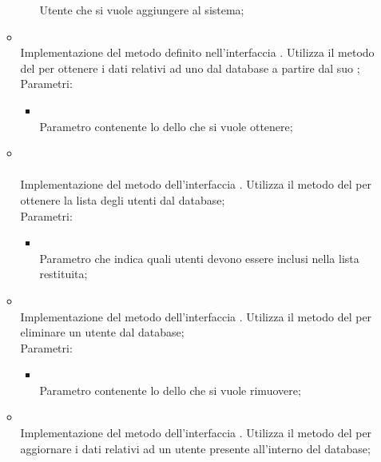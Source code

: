 \begin{itemize}
\begin{itemize}
\begin{itemize}
			Utente che si vuole aggiungere al sistema;
		\end{itemize}
		\item[]  \\		Implementazione del metodo definito nell'interfaccia . Utilizza il metodo  del  per ottenere i dati relativi ad uno  dal database a partire dal suo ;\\
		Parametri:
		\begin{itemize}
			\item {} \\
			Parametro contenente lo  dello  che si vuole ottenere;
		\end{itemize}
		\item[]  \\\\		Implementazione del metodo dell'interfaccia . Utilizza il metodo  del  per ottenere la lista degli utenti dal database;\\
		Parametri:
		\begin{itemize}
			\item {} \\
			Parametro che indica quali utenti devono essere inclusi nella lista restituita;
		\end{itemize}
		\item[]  \\		Implementazione del metodo dell'interfaccia . Utilizza il metodo  del  per eliminare un utente dal database;\\
		Parametri:
		\begin{itemize}
			\item {} \\
			Parametro contenente lo  dello  che si vuole rimuovere;
		\end{itemize}
		\item[]  \\		Implementazione del metodo dell'interfaccia . Utilizza il metodo  del  per aggiornare i dati relativi ad un utente presente all'interno del database;\\

\end{itemize}
\end{itemize}
